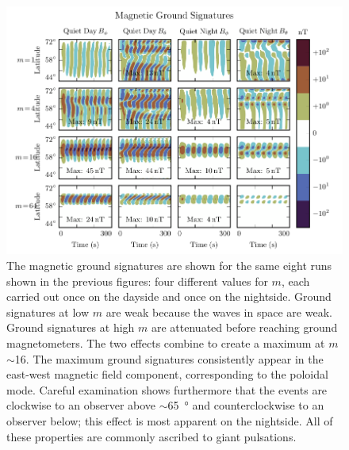 \documentclass{article}
\newcommand{\about}{\ensuremath{\sim}}
\newcommand{\azm}{\ensuremath{m}\xspace}
\begin{document}

\begin{figure}
    \label{fig_ground}
    \begin{center}
    \includegraphics[width=\textwidth]{figures/fig_ground.pdf}
    \caption{
        The magnetic ground signatures are shown for the same eight runs shown in the previous figures: four different values for \azm, each carried out once on the dayside and once on the nightside. Ground signatures at low \azm are weak because the waves in space are weak. Ground signatures at high \azm are attenuated before reaching ground magnetometers. The two effects combine to create a maximum at \azm\about16. The maximum ground signatures consistently appear in the east-west magnetic field component, corresponding to the poloidal mode. Careful examination shows furthermore that the events are clockwise to an observer above \about\SI{65}{\degree} and counterclockwise to an observer below; this effect is most apparent on the nightside. All of these properties are commonly ascribed to giant pulsations. 
    }
    \end{center}
\end{figure}


\end{document}
